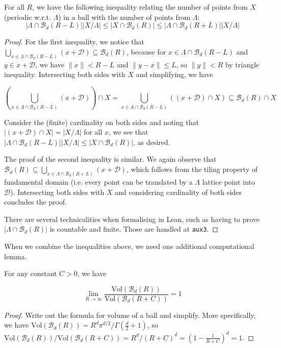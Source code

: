 \begin{lemma}\label{lemma:periodic-points-bounds}\leanok
  For all $R$, we have the following inequality relating the number of points from $X$ (periodic w.r.t. $\Lambda$) in a ball with the number of points from $\Lambda$:
  \[
    \left|\Lambda \cap \mathcal{B}_d(R - L)\right|\left|X / \Lambda\right|
    \leq \left|X \cap \mathcal{B}_d(R)\right|
    \leq \left|\Lambda \cap \mathcal{B}_d(R + L)\right|\left|X / \Lambda\right|
  \]
\end{lemma}
\begin{proof}\leanok
  For the first inequality, we notice that $\bigcup_{x \in \Lambda \cap \mathcal{B}_d(R - L)} (x + \mathcal{D}) \subseteq \mathcal{B}_d(R)$, because for $x \in \Lambda \cap \mathcal{B}_d(R - L)$ and $y \in x + \mathcal{D}$, we have $\|x\| < R - L$ and $\|y - x\| \leq L$, so $\|y\| < R$ by triangle inequality. Intersecting both sides with $X$ and simplifying, we have

  \[
    \left(\bigcup_{x \in \Lambda \cap \mathcal{B}_d(R - L)} (x + \mathcal{D})\right) \cap X = \bigcup_{x \in \Lambda \cap \mathcal{B}_d(R - L)} ((x + \mathcal{D}) \cap X) \subseteq \mathcal{B}_d(R) \cap X
  \]

  Consider the (finite) cardinality on both sides and noting that $|(x + \mathcal{D}) \cap X| = |X / \Lambda|$ for all $x$, we see that $|\Lambda \cap \mathcal{B}_d(R - L)||X / \Lambda| \leq |X \cap \mathcal{B}_d(R)|$, as desired.

  The proof of the second inequality is similar. We again observe that $\mathcal{B}_d(R) \subseteq \bigcup_{x \in \Lambda \cap \mathcal{B}_d(R + L)} (x + \mathcal{D})$, which follows from the tiling property of fundamental domain (i.e. every point can be translated by a $\Lambda$ lattice point into $\mathcal{D}$). Intersecting both sides with $X$ and considering cardinality of both sides concludes the proof.

  There are several technicalities when formalising in Lean, such as having to prove $|\Lambda \cap \mathcal{B}_d(R)|$ is countable and finite. Those are handled at \texttt{aux3}.
\end{proof}

When we combine the inequalities above, we need one additional computational lemma.

\begin{lemma}\label{lemma:volume-ball-ratio-limit}\leanok
  For any constant $C > 0$, we have

  \[
    \lim_{R \to \infty} \frac{\mathrm{Vol}(\mathcal{B}_d(R))}{\mathrm{Vol}(\mathcal{B}_d(R + C))} = 1
  \]
\end{lemma}
\begin{proof}\leanok
  Write out the formula for volume of a ball and simplify. More specifically, we have $\mathrm{Vol}(\mathcal{B}_d(R)) = R^d \pi^{d / 2} / \Gamma\left(\frac{d}{2} + 1\right)$, so $\mathrm{Vol}(\mathcal{B}_d(R)) / \mathrm{Vol}(\mathcal{B}_d(R + C)) = R^d / (R + C)^d = \left(1 - \frac{1}{R + C}\right)^d = 1$.
\end{proof}

